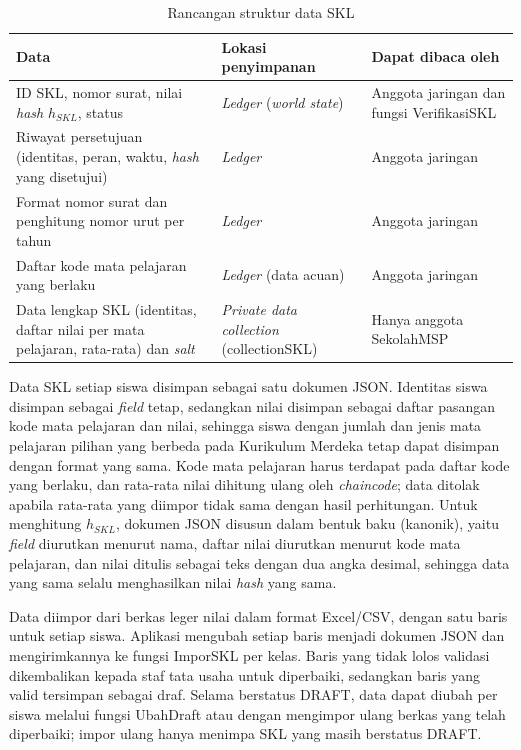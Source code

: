\begin{table}[H]
    \centering
    \caption{Rancangan struktur data SKL}
    \label{table:3.struktur}
    \footnotesize
    \renewcommand{\arraystretch}{1.25}
    \begin{tabular}{|>{\raggedright\arraybackslash}p{}|>{\raggedright\arraybackslash}p{}|>{\raggedright\arraybackslash}p{}|}
        \hline
        \textbf{Data} & \textbf{Lokasi penyimpanan} & \textbf{Dapat dibaca oleh} \\
        \hline
        ID SKL, nomor surat, nilai \textit{hash} $h_{SKL}$, status & \textit{Ledger} (\textit{world state}) & Anggota jaringan dan fungsi VerifikasiSKL \\
        \hline
        Riwayat persetujuan (identitas, peran, waktu, \textit{hash} yang disetujui) & \textit{Ledger} & Anggota jaringan \\
        \hline
        Format nomor surat dan penghitung nomor urut per tahun & \textit{Ledger} & Anggota jaringan \\
        \hline
        Daftar kode mata pelajaran yang berlaku & \textit{Ledger} (data acuan) & Anggota jaringan \\
        \hline
        Data lengkap SKL (identitas, daftar nilai per mata pelajaran, rata-rata) dan \textit{salt} & \textit{Private data collection} (collectionSKL) & Hanya anggota SekolahMSP \\
        \hline
    \end{tabular}
\end{table}

Data SKL setiap siswa disimpan sebagai satu dokumen JSON. Identitas siswa disimpan sebagai \textit{field} tetap, sedangkan nilai disimpan sebagai daftar pasangan kode mata pelajaran dan nilai, sehingga siswa dengan jumlah dan jenis mata pelajaran pilihan yang berbeda pada Kurikulum Merdeka tetap dapat disimpan dengan format yang sama. Kode mata pelajaran harus terdapat pada daftar kode yang berlaku, dan rata-rata nilai dihitung ulang oleh \textit{chaincode}; data ditolak apabila rata-rata yang diimpor tidak sama dengan hasil perhitungan. Untuk menghitung $h_{SKL}$, dokumen JSON disusun dalam bentuk baku (kanonik), yaitu \textit{field} diurutkan menurut nama, daftar nilai diurutkan menurut kode mata pelajaran, dan nilai ditulis sebagai teks dengan dua angka desimal, sehingga data yang sama selalu menghasilkan nilai \textit{hash} yang sama.

Data diimpor dari berkas leger nilai dalam format Excel/CSV, dengan satu baris untuk setiap siswa. Aplikasi mengubah setiap baris menjadi dokumen JSON dan mengirimkannya ke fungsi ImporSKL per kelas. Baris yang tidak lolos validasi dikembalikan kepada staf tata usaha untuk diperbaiki, sedangkan baris yang valid tersimpan sebagai draf. Selama berstatus DRAFT, data dapat diubah per siswa melalui fungsi UbahDraft atau dengan mengimpor ulang berkas yang telah diperbaiki; impor ulang hanya menimpa SKL yang masih berstatus DRAFT.


